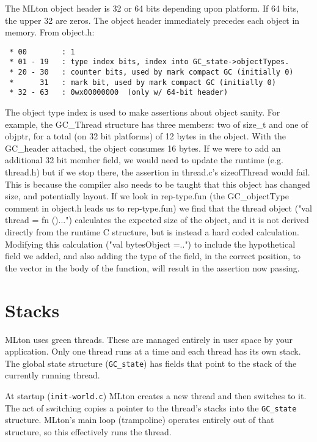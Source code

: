 The MLton object header is 32 or 64 bits depending upon platform. If 64 bits, the upper 32 are zeros. The object header immediately precedes each object in memory. From object.h:

\begin{verbatim}
 * 00        : 1
 * 01 - 19   : type index bits, index into GC_state->objectTypes.
 * 20 - 30   : counter bits, used by mark compact GC (initially 0)
 *      31   : mark bit, used by mark compact GC (initially 0)
 * 32 - 63   : 0wx00000000  (only w/ 64-bit header)	
\end{verbatim}

The object type index is used to make assertions about object sanity. For example, the GC\_Thread structure has three members: two of size\_t and one of objptr, for a total (on 32 bit platforms) of 12 bytes in the object. With the GC\_header attached, the object consumes 16 bytes. If we were to add an additional 32 bit member field, we would need to update the runtime (e.g. thread.h) but if we stop there, the assertion in thread.c's sizeofThread would fail. This is because the compiler also needs to be taught that this object has changed size, and potentially layout. If we look in rep-type.fun (the GC\_objectType comment in object.h leads us to rep-type.fun) we find that the thread object ("val thread = fn ()...") calculates the expected size of the object, and it is not derived directly from the runtime C structure, but is instead a hard coded calculation. Modifying this calculation ("val bytesObject =..") to include the hypothetical field we added, and also adding the type of the field, in the correct position, to the vector in the body of the function, will result in the assertion now passing.

\section{Stacks}

MLton uses green threads. These are managed entirely in user space by your application. Only one thread runs at a time and each thread has its own stack. The global state structure (\texttt{GC\_state}) has fields that point to the stack of the currently running thread.

At startup (\texttt{init-world.c}) MLton creates a new thread and then switches to it. The act of switching copies a pointer to the thread's stacks into the \texttt{GC\_state} structure. MLton's main loop (trampoline) operates entirely out of that structure, so this effectively runs the thread.

